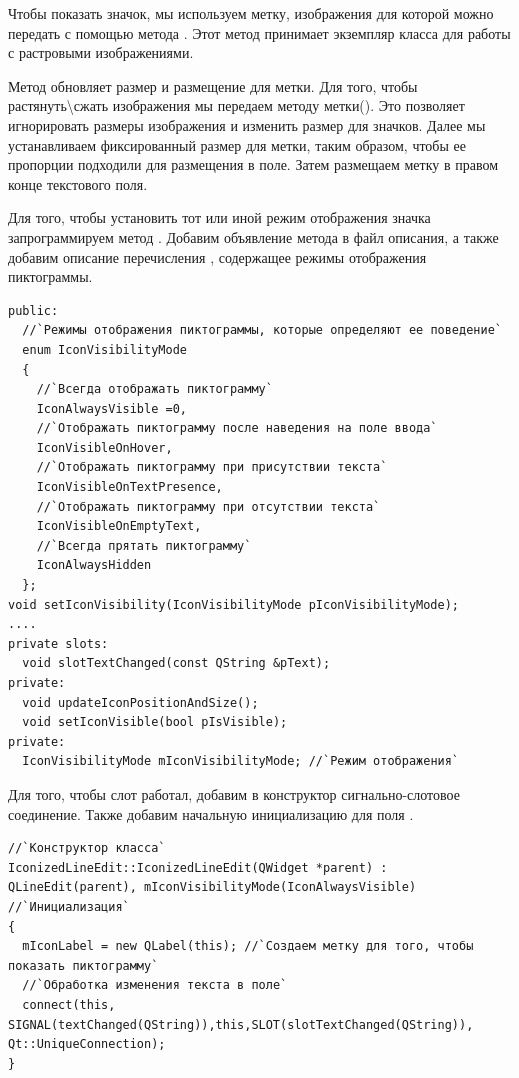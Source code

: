 Чтобы показать значок, мы используем метку, изображения для которой можно передать с помощью метода
. Этот метод принимает экземпляр  класса для работы с
растровыми изображениями.

Метод  обновляет размер и размещение для метки. Для того, чтобы
растянуть{\textbackslash}сжать изображения мы передаем  методу метки(). Это
позволяет игнорировать размеры изображения и изменить размер для значков. Далее мы устанавливаем фиксированный размер
для метки, таким образом, чтобы ее пропорции подходили для размещения в поле. Затем размещаем метку в правом конце
текстового поля.

Для того, чтобы установить тот или иной режим отображения значка запрограммируем метод .
Добавим объявление метода в файл описания, а также добавим описание перечисления ,
содержащее режимы отображения пиктограммы.
\begin{lstlisting}
public:
  //`Режимы отображения пиктограммы, которые определяют ее поведение`
  enum IconVisibilityMode 
  {
    //`Всегда отображать пиктограмму`
    IconAlwaysVisible =0,
    //`Отображать пиктограмму после наведения на поле ввода`
    IconVisibleOnHover,
    //`Отображать пиктограмму при присутствии текста`
    IconVisibleOnTextPresence,
    //`Отображать пиктограмму при отсутствии текста`
    IconVisibleOnEmptyText,
    //`Всегда прятать пиктограмму`
    IconAlwaysHidden
  };
void setIconVisibility(IconVisibilityMode pIconVisibilityMode);
....
private slots:
  void slotTextChanged(const QString &pText);
private:
  void updateIconPositionAndSize();
  void setIconVisible(bool pIsVisible);
private:
  IconVisibilityMode mIconVisibilityMode; //`Режим отображения`
\end{lstlisting}

Для того, чтобы слот  работал, добавим в конструктор сигнально-слотовое соединение.
Также добавим начальную инициализацию для поля .
\begin{lstlisting}
//`Конструктор класса`
IconizedLineEdit::IconizedLineEdit(QWidget *parent) : QLineEdit(parent), mIconVisibilityMode(IconAlwaysVisible) //`Инициализация`
{
  mIconLabel = new QLabel(this); //`Создаем метку для того, чтобы показать пиктограмму`
  //`Обработка изменения текста в поле`
  connect(this, SIGNAL(textChanged(QString)),this,SLOT(slotTextChanged(QString)), Qt::UniqueConnection);
}
\end{lstlisting}

